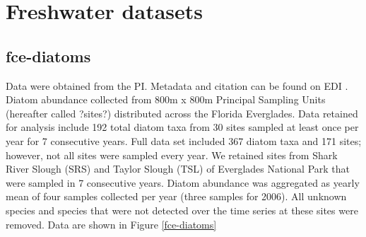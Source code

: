 \documentclass[11pt, oneside]{article}
\begin{document}
\section {Freshwater datasets}

\subsection {fce-diatoms}
Data were obtained from the PI.
Metadata and citation can be found on EDI \citep{fce-diatoms}.
Diatom abundance collected from 800m x 800m Principal Sampling Units (hereafter called ?sites?) distributed across the Florida Everglades. 
Data retained for analysis include 192 total diatom taxa from 30 sites sampled at least once per year for 7 consecutive years. 
Full data set included 367 diatom taxa and 171 sites; however, not all sites were sampled every year. 
We retained sites from Shark River Slough (SRS) and Taylor Slough (TSL) of Everglades National Park that were sampled in 7 consecutive years. 
Diatom abundance was aggregated as yearly mean of four samples collected per year (three samples for 2006). 
All unknown species and species that were not detected over the time series at these sites were removed.
Data are shown in Figure \ref{fce-diatoms}
\end{document}

